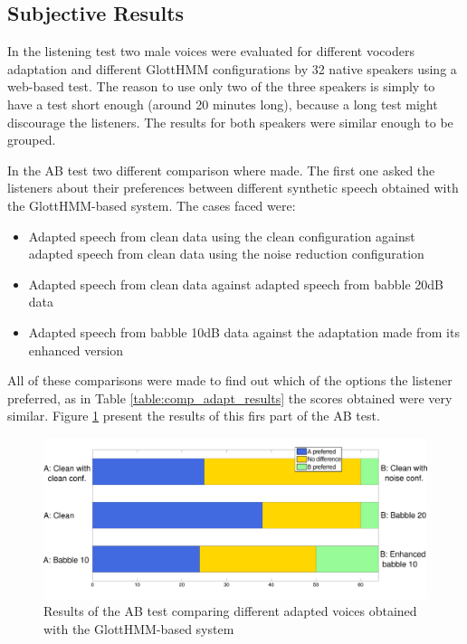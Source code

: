 \subsection{Subjective Results}
\label{results_subjective}
In the listening test two male voices were evaluated for different vocoders adaptation and different GlottHMM configurations by 32 native speakers using a web-based test.
%
The reason to use only two of the three speakers is simply to have a test short enough (around 20 minutes long), because a long test might discourage the listeners.
%
The results for both speakers were similar enough to be grouped.

In the AB test two different comparison where made.
%
The first one asked the listeners about their preferences between different synthetic speech obtained with the GlottHMM-based system.
%
The cases faced were:

\begin{itemize}
	\item Adapted speech from clean data using the clean configuration against adapted speech from clean data using the noise reduction configuration
	\item Adapted speech from clean data against adapted speech from babble 20dB data
	\item Adapted speech from babble 10dB data against the adaptation made from its enhanced version
\end{itemize}

All of these comparisons were made to find out which of the options the listener preferred, as in Table \ref{table:comp_adapt_results} the scores obtained were very similar.
%
Figure \ref{fig:glott_vs_glott} present the results of this firs part of the AB test.

\begin{figure}[!htb]
  \begin{centering}
  \includegraphics[width=\textwidth]{images/glott_vs_glott.pdf}
  \caption{Results of the AB test comparing different adapted voices obtained with the GlottHMM-based system}
  \label{fig:glott_vs_glott}
  \end{centering}
\end{figure}


